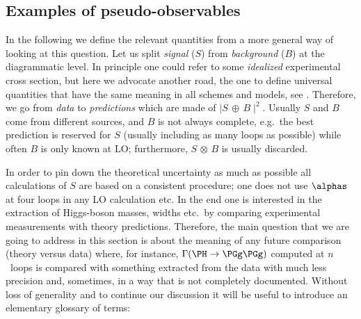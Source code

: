 \subsection{Examples of pseudo-observables}
In the following we define the relevant quantities from a more general way of 
looking at this question.
Let us split {\em signal} ($S$) from {\em background} ($B$) at the 
diagrammatic level. In principle one could refer to some {\em idealized} 
experimental cross section, but here we advocate another road, the one to 
define universal quantities that have the same meaning in all schemes and 
models, see .
Therefore, we go from {\em data} to {\em predictions} which are made of 
$\mid S\,\oplus\,B\mid^2$. Usually $S$ and $B$ come from different sources, and
$B$ is not always complete, e.g.\ the best prediction is reserved for $S$
(usually including as many loops as possible) while often $B$ is
only known at LO; furthermore, $S\,\otimes\,B$ is usually discarded. 

In order to pin down the theoretical uncertainty as much as possible all
calculations of $S$ are based on a consistent procedure; one does not use 
$\alphas$ at four loops in any LO calculation etc.  
In the end one is interested in the extraction of Higgs-boson masses,
widths etc.\ by comparing experimental measurements with theory predictions.
Therefore, the main question that we are going to address in this section is
about the meaning of any future comparison (theory versus data) where, 
for instance, $\Gamma(\PH \to \PGg\PGg)$ computed at $n$~loops is compared 
with something extracted from the data with much less precision and, sometimes, 
in a way that is not completely documented.
Without loss of generality and to continue our discussion it will be useful 
to introduce an elementary glossary of terms:

